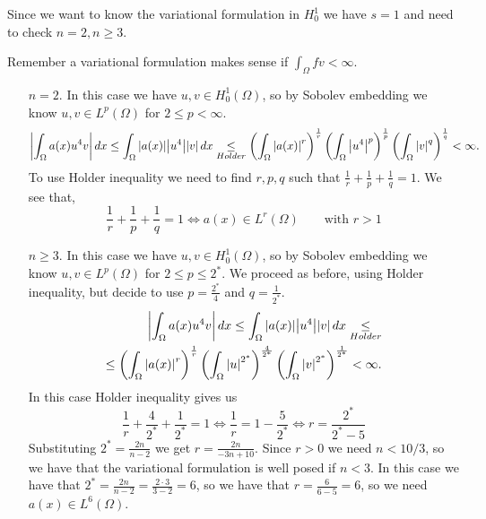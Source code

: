 Since we want to know the variational formulation in \(H^1_0\) we have \(s =
1\) and need to check \(n = 2, n \geq 3\).

Remember a variational formulation makes sense if \(\int_\Omega fv < \infty\).
\begin{itemize}
    \item[\(n = 2\).] In this case we have \(u, v \in H^1_0(\Omega)\), so by Sobolev embedding we know \(u, v \in L^p(\Omega)\) for \(2 \leq p < \infty\).
          \[
              \abs{\int_\Omega a(x) u^4 v}  \, dx \leq \int_\Omega \abs{a(x)} \abs{u^4} \abs{v} \, dx \underset{Holder}{\leq} \left(\int_\Omega \abs{a(x)}^r\right)^{\frac{1}{r}} \left(\int_\Omega \abs{u^4}^p \right)^{\frac{1}{p}} \left(\int_\Omega \abs{v}^q \right)^{\frac{1}{q}} < \infty.
          \]
          To use Holder inequality we need to find \(r, p, q\) such that \(\frac{1}{r} +
          \frac{1}{p} + \frac{1}{q} = 1\). We see that,
          \[
              \frac{1}{r} + \frac{1}{p} + \frac{1}{q} = 1 \iff a(x) \in L^r(\Omega) \qquad \text{with } r > 1
          \]
    \item[\(n \geq 3\).] In this case we have \(u, v \in H^1_0(\Omega)\), so by Sobolev embedding we know \(u, v \in L^p(\Omega)\) for \(2 \leq p \leq 2^*\).
          We proceed as before, using Holder inequality, but decide to use \(p = \frac{2^*}{4}\) and \(q = \frac{1}{2^*}.\)
          \[
              \begin{split}
                  \abs{\int_\Omega a(x) u^4 v}  \, dx \leq \int_\Omega \abs{a(x)} \abs{u^4} \abs{v} \, dx \underset{{Holder}}{\leq} \\
                  \leq \left(\int_\Omega \abs{a(x)}^r\right)^{\frac{1}{r}} \left(\int_\Omega \abs{u}^{2^*} \right)^{\frac{4}{2^*}} \left(\int_\Omega \abs{v}^{2^*} \right)^{\frac{1}{2^*}} < \infty.
              \end{split}
          \]
          In this case Holder inequality gives us
          \[
              \frac{1}{r} + \frac{4}{2^*} + \frac{1}{2^*} = 1 \iff \frac{1}{r} = 1 - \frac{5}{2^*} \iff r = \frac{2^*}{2^* - 5}
          \]
          Substituting \(2^* = \frac{2n}{n - 2}\) we get \(r = \frac{2n}{-3n + 10}\).
          Since \(r > 0\) we need \(n < 10/3\), so we have that the variational
          formulation is well posed if \(n < 3\). In this case we have that \(2^* =
          \frac{2n}{n - 2} = \frac{2 \cdot 3}{3 - 2} = 6\), so we have that \(r =
          \frac{6}{6 - 5} = 6\), so we need \(a(x) \in L^6(\Omega)\).
\end{itemize}
\newpage

